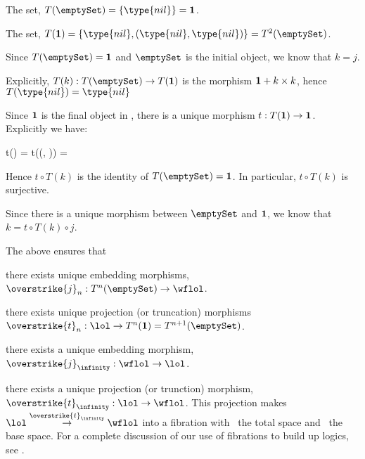 \item The set, $T(\emptySet) = \{ \type{nil} \} = \bold{1}$.

\item The set, $T(\bold{1}) = \{ \type{nil}, (\type{nil}, \type{nil}) \} = 
T^2(\emptySet)$. 

\item Since $T(\emptySet) = \bold{1}$ and $\emptySet$ is the initial 
object, we know that $k = j$. 

\item Explicitly, $T(k) : T(\emptySet) \rightarrow T(\bold{1})$ is the 
morphism $\bold{1} + k \times k$, hence $T(\type{nil}) = \type{nil}$ 

\item Since $\bold{1}$ is the final object in \Set, there is a unique 
morphism $t: T(\bold{1}) \rightarrow \bold{1}$. Explicitly we have:

\startformula\startalign
  \NC t()               \NC =  \NR
  \NC t((, )) \NC =  \NR
\stopalign\stopformula

\noindent Hence $t \circ T(k)$ is the identity of $T(\emptySet) = 
\bold{1}$. In particular, $t \circ T(k)$ is surjective.

\item Since there is a unique morphism between $\emptySet$ and $\bold{1}$, 
we know that $k = t \circ T(k) \circ j$. 

\item The above ensures that

\startitemize[a]

\item there exists unique embedding morphisms, 
$\overstrike{j}_n : T^n(\emptySet) \rightarrow \wflol$. 

\item there exists unique projection (or truncation) 
morphisms $\overstrike{t}_n : \lol \rightarrow T^n(\bold{1}) = 
T^{n+1}(\emptySet)$. 

\item there exists a unique embedding morphism, 
$\overstrike{j}_{\infinity} : \wflol \rightarrow \lol$. 

\item there exists a unique projection (or trunction) morphism, 
$\overstrike{t}_{\infinity} : \lol \rightarrow \wflol$. This projection 
makes $\lol \overset{\overstrike{t}_{\infinity}}{\rightarrow} \wflol$ into 
a fibration with \lol\ the total space and \wflol\ the base space. For a 
complete discussion of our use of fibrations to build up logics, see 
\cite{jacobs1999categoricalLogicTypeTheory}.  

